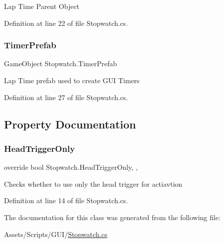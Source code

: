 Lap Time Parent Object 



Definition at line 22 of file Stopwatch.\+cs.

\mbox{\label{class_stopwatch_a2b171fcfbbe6042c381eea3f0697d831}} 
\subsubsection{\texorpdfstring{Timer\+Prefab}{TimerPrefab}}
{\footnotesize\ttfamily Game\+Object Stopwatch.\+Timer\+Prefab}



Lap Time prefab used to create G\+UI Timers 



Definition at line 27 of file Stopwatch.\+cs.



\subsection{Property Documentation}
\mbox{\label{class_stopwatch_ae64c783be2fb89590b292e86bded720a}} 
\subsubsection{\texorpdfstring{Head\+Trigger\+Only}{HeadTriggerOnly}}
{\footnotesize\ttfamily override bool Stopwatch.\+Head\+Trigger\+Only\hspace{0.3cm}{\ttfamily [get]}, {\ttfamily [set]}, {\ttfamily [protected]}}



Checks whether to use only the head trigger for actiavtion 



Definition at line 14 of file Stopwatch.\+cs.



The documentation for this class was generated from the following file\+:\begin{DoxyCompactItemize}
\item 
Assets/\+Scripts/\+G\+U\+I/\mbox{\hyperlink{_stopwatch_8cs}{Stopwatch.\+cs}}\end{DoxyCompactItemize}
